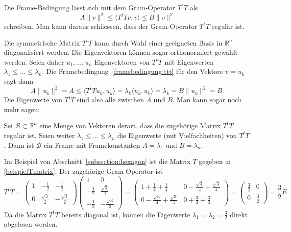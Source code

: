 Die Frame-Bedingung lässt sich mit dem Gram-Operator $T^tT$ als
\begin{equation}
A \|v\|^2
\le
\langle T^t T v,v\rangle
\le
B \|v\|^2
\label{framebedingung:ttt}
\end{equation}
schreiben.
Man kann daraus schliessen, dass der Gram-Operator $T^tT$ regulär ist.

Die symmetrische Matrix $T^tT$ kann durch Wahl einer geeigneten Basis
in $\mathbb R^n$ diagonalisiert werden.
Die Eigenvektoren können sogar orthonormiert gewählt werden.
Seien daher $u_1,\dots,u_n$ Eigenvektoren von $T^tT$ mit Eigenwerten
$\lambda_1\le\dots\le\lambda_n$.
Die Framebedingung~\eqref{framebedingung:ttt}
für den Vektore $v=u_k$ sagt dann
\[
A \| u_k\|^2
=
A
\le
\langle T^tTu_k,u_k\rangle
=
\lambda_k\langle u_k,u_k\rangle
=
\lambda_k
=
B \| u_k\|^2
=
B.
\]
Die Eigenwerte von $T^tT$ sind also alle zwischen $A$ und $B$.
Man kann sogar noch mehr sagen:

\begin{satz}
Sei $\mathcal{B}\subset\mathbb R^n$ eine Menge von Vektoren derart,
dass die zugehörige Matrix $T^tT$ regulär ist.
Seien weiter $\lambda_1\le\dots\le \lambda_n$ die Eigenwerte
(mit Vielfachheiten) von $T^tT$.
Dann ist $\mathcal{B}$ ein Frame mit Framekonstanten
$A=\lambda_1$ und $B=\lambda_n$.
\end{satz}

\begin{beispiel}
Im Beispiel von Abschnitt~\ref{subsection:hexagon} ist die Matrix $T$
gegeben in \eqref{beispielTmatrix}.
Der zugehörige Gram-Operator ist
\[
T^tT
=
\begin{pmatrix}
1& -\frac12        &-\frac12          \\[2pt]
0& \frac{\sqrt{3}}2& -\frac{\sqrt{3}}2
\end{pmatrix}
\begin{pmatrix}
1&0\\
-\frac12&\frac{\sqrt{3}}2\\[2pt]
-\frac12&-\frac{\sqrt{3}}2
\end{pmatrix}
=
\begin{pmatrix}
1+\frac14+\frac14 & 0-\frac{\sqrt{3}}4+\frac{\sqrt{3}}4\\[2pt]
0-\frac{\sqrt{3}}4+\frac{\sqrt{3}}4&0+\frac{3}{4}+\frac{3}{4}
\end{pmatrix}
=
\begin{pmatrix}
\frac32&0\\
0&\frac32
\end{pmatrix}
=
\frac{3}{2}E
\]
Da die Matrix $T^tT$ bereits diagonal ist, können die Eigenwerte
$\lambda_1=\lambda_2=\frac32$ direkt abgelesen werden.
\end{beispiel}

